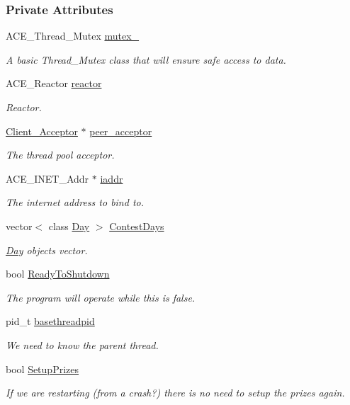 \subsubsection*{Private Attributes}
\begin{CompactItemize}
\item 
ACE\_\-Thread\_\-Mutex \hyperlink{classContest_Contesto0}{mutex\_\-}
\begin{CompactList}\small\item\em A basic Thread\_\-Mutex class that will ensure safe access to data.\item\end{CompactList}\item 
ACE\_\-Reactor \hyperlink{classContest_Contesto1}{reactor}
\begin{CompactList}\small\item\em Reactor.\item\end{CompactList}\item 
\hyperlink{classClient__Acceptor}{Client\_\-Acceptor} $\ast$ \hyperlink{classContest_Contesto2}{peer\_\-acceptor}
\begin{CompactList}\small\item\em The thread pool acceptor.\item\end{CompactList}\item 
ACE\_\-INET\_\-Addr $\ast$ \hyperlink{classContest_Contesto3}{iaddr}
\begin{CompactList}\small\item\em The internet address to bind to.\item\end{CompactList}\item 
vector$<$ class \hyperlink{classDay}{Day} $>$ \hyperlink{classContest_Contesto4}{Contest\-Days}
\begin{CompactList}\small\item\em \hyperlink{classDay}{Day} objects vector.\item\end{CompactList}\item 
bool \hyperlink{classContest_Contesto5}{Ready\-To\-Shutdown}
\begin{CompactList}\small\item\em The program will operate while this is false.\item\end{CompactList}\item 
pid\_\-t \hyperlink{classContest_Contesto6}{basethreadpid}
\begin{CompactList}\small\item\em We need to know the parent thread.\item\end{CompactList}\item 
bool \hyperlink{classContest_Contesto7}{Setup\-Prizes}
\begin{CompactList}\small\item\em If we are restarting (from a crash?) there is no need to setup the prizes again.\item\end{CompactList}\end{CompactItemize}


